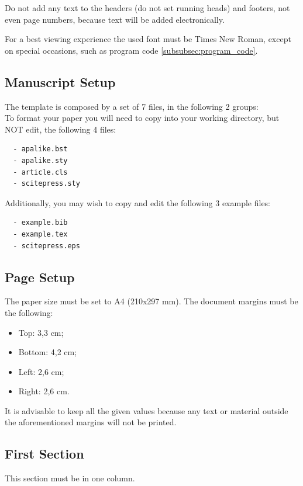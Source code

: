\documentclass[a4paper,twoside]{article}
\begin{document}
Do not add any text to the headers (do not set running heads) and
footers, not even page numbers, because text will be added
electronically.

For a best viewing experience the used font must be Times New
Roman, except on special occasions, such as program code
\ref{subsubsec:program_code}.


\subsection{Manuscript Setup}

The template is composed by a set of 7 files, in the
following 2 groups:\\
 To format your paper you will need to copy
into your working directory, but NOT edit, the following 4 files:
\begin{verbatim}
  - apalike.bst
  - apalike.sty
  - article.cls
  - scitepress.sty
\end{verbatim}

 Additionally, you may wish to copy and edit
the following 3 example files:
\begin{verbatim}
  - example.bib
  - example.tex
  - scitepress.eps
\end{verbatim}


\subsection{Page Setup}

The paper size must be set to A4 (210x297 mm). The document
margins must be the following:

\begin{itemize}
    \item Top: 3,3 cm;
    \item Bottom: 4,2 cm;
    \item Left: 2,6 cm;
    \item Right: 2,6 cm.
\end{itemize}

It is advisable to keep all the given values because any text or
material outside the aforementioned margins will not be printed.


\subsection{First Section}

This section must be in one column.
\end{document}
